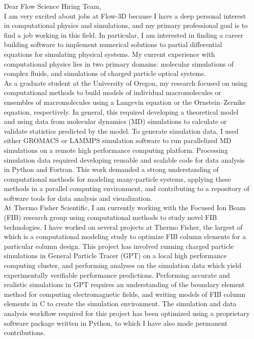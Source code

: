 \documentclass[]{letter}
\begin{document}

Dear Flow Science Hiring Team, \\

I am very excited about jobs at Flow-3D because I have a deep personal interest in computational physics and simulations, and my primary professional goal is to find a job working in this field. In particular, I am interested in finding a career building software to implement numerical solutions to partial differential equations for simulating physical systems. My current experience with computational physics lies in two primary domains: molecular simulations of complex fluids, and simulations of charged particle optical systems. \\

As a graduate student at the University of Oregon, my research focused on using computational methods to build models of individual macromolecules or ensembles of macromolecules using a Langevin equation or the Ornstein–Zernike equation, respectively. In general, this required developing a theoretical model and using data from molecular dynamics (MD) simulations to calculate or validate statistics predicted by the model. To generate simulation data, I used either GROMACS or LAMMPS simulation software to run parallelized MD simulations on a remote high performance computing platform. Processing simulation data required developing reusable and scalable code for data analysis in Python and Fortran. This work demanded a strong understanding of computational methods for modeling many-particle systems, applying these methods in a parallel computing environment, and contributing to a repository of software tools for data analysis and visualization. \\

At Thermo Fisher Scientific, I am currently working with the Focused Ion Beam (FIB) research group using computational methods to study novel FIB technologies. I have worked on several projects at Thermo Fisher, the largest of which is a computational modeling study to optimize FIB column elements for a particular column design. This project has involved running charged particle simulations in General Particle Tracer (GPT) on a local high performance computing cluster, and performing analyses on the simulation data which yield experimentally verifiable performance predictions. Performing accurate and realistic simulations in GPT requires an understanding of the boundary element method for computing electromagnetic fields, and writing models of FIB column elements in C to create the simulation environment. The simulation and data analysis workflow required for this project has been optimized using a proprietary software package written in Python, to which I have also made permanent contributions. \\
\end{document}
